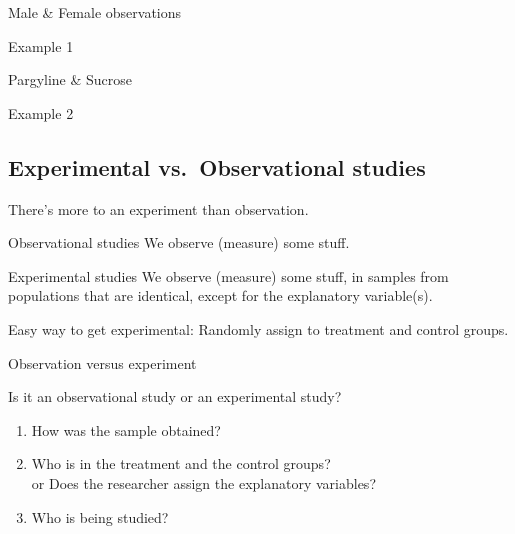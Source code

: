 \begin{frame}{Male \& Female observations}

\begin{block}{Example 1}

\end{block}

\end{frame}

\begin{frame}{Pargyline \& Sucrose}

  \begin{block}{Example 2}

  \end{block}

\end{frame}


\subsection{Experimental vs.\ Observational studies}

\begin{frame}{There's more to an experiment than observation.}

  \begin{block}{Observational studies}
    We \alert{observe} (measure) some stuff.
  \end{block}

  \vspace{2em}

  \begin{block}{Experimental studies}
    We observe (measure) some stuff, 
    in samples from populations that are identical,
    except for the explanatory variable(s).
  \end{block}

  \vspace{2em}

  \alert{Easy way to get experimental:}
  Randomly assign to treatment and control groups.

\end{frame}

%
\begin{frame}{Observation versus experiment}

  Is it an observational study or an experimental study?
  \begin{enumerate}

    \item How was the sample obtained?

    \item Who is in the treatment and the control groups? \\
      \alert{or} Does the researcher assign the explanatory variables?

    \item Who is being studied?

  \end{enumerate}

\end{frame}

